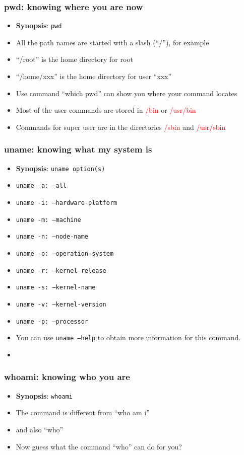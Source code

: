 \documentclass[red]{beamer}
\begin{document}
\begin{CJK*}{GBK}{kai}
\begin{frame}
\frametitle{pwd: knowing where you are now}
\begin{itemize}
    \item \textbf{Synopsis}: \texttt{pwd}
    \item All the path names are started with a slash (``/''), for example
    \item ``/root'' is the home directory for root
    \item ``/home/xxx'' is the home directory for user ``xxx''
    \item Use command ``which pwd'' can show you where your command locates
    \item Most of the user commands are stored in \textcolor{red}{/bin} or \textcolor{red}{/usr/bin}
    \item Commands for super user are in the directories \textcolor{red}{/sbin} and \textcolor{red}{/usr/sbin}
\end{itemize}
\end{frame}

\begin{frame}
\frametitle{uname: knowing what my system is}
\begin{itemize}
    \item \textbf{Synopsis}: \texttt{uname option(s)}
    \item \texttt{uname -a: --all}
    \item \texttt{uname -i: --hardware-platform}
    \item \texttt{uname -m: --machine}
    \item \texttt{uname -n: --node-name}
    \item \texttt{uname -o: --operation-system}
    \item \texttt{uname -r: --kernel-release}
    \item \texttt{uname -s: --kernel-name}
    \item \texttt{uname -v: --kernel-version}
    \item \texttt{uname -p: --processor}
    \item You can use \texttt{uname --help} to obtain more information for this command.
    \item \color{blue!80}{This command is very useful in
compiling the system-dependent code.}
\end{itemize}
\end{frame}

\begin{frame}
\frametitle{whoami: knowing who you are}
\begin{itemize}
    \item \textbf{Synopsis}: \texttt{whoami}
    \item The command is different from ``who am i''
    \item and also ``who''
    \item Now guess what the command ``who'' can do for you?
\end{itemize}
\end{frame}


\end{CJK*}
\end{document}
